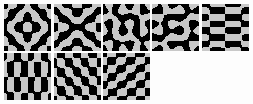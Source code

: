 \includegraphics{o/chladni_049.png}
\includegraphics{o/chladni_050.png}
\includegraphics{o/chladni_051.png}
\includegraphics{o/chladni_052.png}
\includegraphics{o/chladni_053.png}
\includegraphics{o/chladni_054.png}
\includegraphics{o/chladni_055.png}
\includegraphics{o/chladni_056.png}

